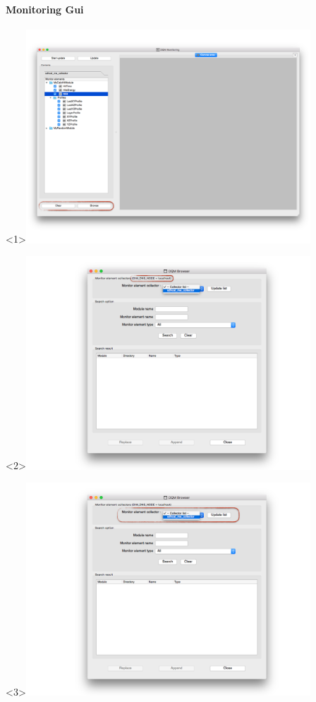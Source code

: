 \documentclass[8pt]{beamer}
\begin{document}
  
 \begin{frame}
    \frametitle{\secname}
    \framesubtitle{ Monitoring Gui }
    
    \begin{overlayarea}{\textwidth}{\textheight}
      \begin{center}
        \begin{onlyenv}<1>\includegraphics[width=0.8\textwidth]{figs/MonitoringGui/MG_Browse.png}\end{onlyenv}
        \begin{onlyenv}<2>\includegraphics[width=0.8\textwidth]{figs/Browser/Browser_DNSNode.png}\end{onlyenv}
         \begin{onlyenv}<3>\includegraphics[width=0.8\textwidth]{figs/Browser/Browser_MESelection}\end{onlyenv}

\end{center}
\end{overlayarea}
\end{frame}
\end{document}
